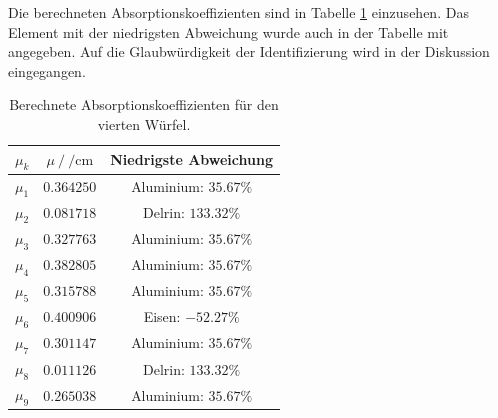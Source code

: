Die berechneten Absorptionskoeffizienten sind in Tabelle \ref{tab:w4_mu} einzusehen. Das Element mit der niedrigsten Abweichung wurde auch in der Tabelle mit angegeben. Auf die Glaubwürdigkeit der Identifizierung wird in der Diskussion eingegangen. 

\begin{table}[H]
  \centering
  \begin{tabular}{c c c}
    \toprule
     $\mu_k$ &  $\mu \:/\: \si{\per\centi\metre}$ & Niedrigste Abweichung \\
    \midrule
            $\mu_{  1}$ &   $ 0.364250$  & Aluminium: $ 35.67\%$\\
            $\mu_{  2}$ &   $ 0.081718$  &   Delrin:  $133.32\%$\\
            $\mu_{  3}$ &   $ 0.327763$  & Aluminium: $ 35.67\%$\\
            $\mu_{  4}$ &   $ 0.382805$  & Aluminium: $ 35.67\%$\\
            $\mu_{  5}$ &   $ 0.315788$  & Aluminium: $ 35.67\%$\\
            $\mu_{  6}$ &   $ 0.400906$  &    Eisen:  $-52.27\%$\\
             $\mu_{ 7}$ &   $ 0.301147$  & Aluminium: $ 35.67\%$\\
             $\mu_{ 8}$ &   $ 0.011126$  &   Delrin:  $133.32\%$\\
             $\mu_{ 9}$ &   $ 0.265038$  & Aluminium: $ 35.67\%$\\
    \bottomrule
    \end{tabular}
  \caption{Berechnete Absorptionskoeffizienten für den vierten Würfel. }
  \label{tab:w4_mu}
\end{table}




